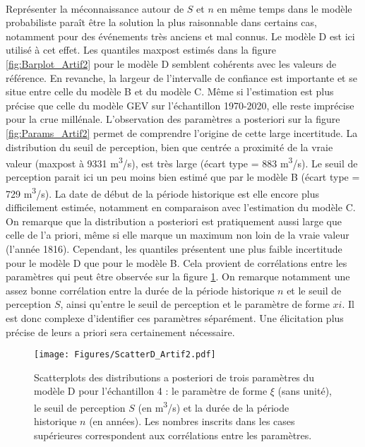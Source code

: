 \documentclass[11pt]{article}
\begin{document}
	\paragraph{} Représenter la méconnaissance autour de $S$ et $n$ en même temps dans le modèle probabiliste paraît être la solution la plus raisonnable dans certains cas, notamment pour des événements très anciens et mal connus. Le modèle D est ici utilisé à cet effet. Les quantiles maxpost estimés dans la figure \ref{fig:Barplot_Artif2} pour le modèle D semblent cohérents avec les valeurs de référence. En revanche, la largeur de l'intervalle de confiance est importante et se situe entre celle du modèle B et du modèle C. Même si l'estimation est plus précise que celle du modèle GEV sur l'échantillon 1970-2020, elle reste imprécise pour la crue millénale. L'observation des paramètres a posteriori sur la figure \ref{fig:Params_Artif2} permet de comprendre l'origine de cette large incertitude. La distribution du seuil de perception, bien que centrée a proximité de la vraie valeur (maxpost à 9331 m\textsuperscript{3}/s), est très large (écart type = 883 m\textsuperscript{3}/s). Le seuil de perception parait ici un peu moins bien estimé que par le modèle B (écart type = 729 m\textsuperscript{3}/s). La date de début de la période historique est elle encore plus difficilement estimée, notamment en comparaison avec l'estimation du modèle C. On remarque que la distribution a posteriori est pratiquement aussi large que celle de l'a priori, même si elle marque un maximum non loin de la vraie valeur (l'année 1816). Cependant, les quantiles présentent une plus faible incertitude pour le modèle D que pour le modèle B. Cela provient de corrélations entre les paramètres qui peut être observée sur la figure \ref{fig:ScatterD_Artif2}. On remarque notamment une assez bonne corrélation entre la durée de la période historique $n$ et le seuil de perception $S$, ainsi qu'entre le seuil de perception et le paramètre de forme $xi$. Il est donc complexe d'identifier ces paramètres séparément. Une élicitation plus précise de leurs a priori sera certainement nécessaire.
	
	\begin{figure}[h]
		\centering
		\texttt{[image: Figures/ScatterD\_Artif2.pdf]}
		\caption{Scatterplots des distributions a posteriori de trois paramètres du modèle D pour l'échantillon 4 : le paramètre de forme $\xi$ (sans unité), le seuil de perception $S$ (en m\textsuperscript{3}/s) et la durée de la période historique $n$ (en années). Les nombres inscrits dans les cases supérieures correspondent aux corrélations entre les paramètres.}
		\label{fig:ScatterD_Artif2}
	\end{figure}
		
\end{document}

